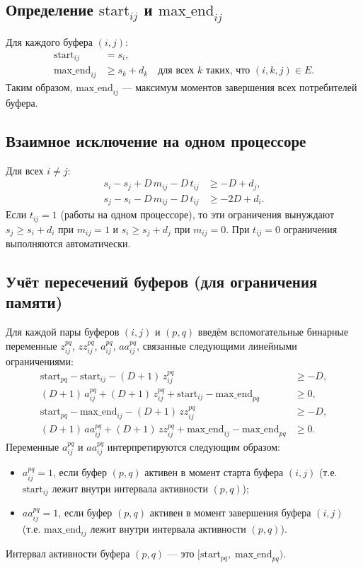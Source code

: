 \subsection*{Определение $\text{start}_{ij}$ и $\text{max\_end}_{ij}$}

Для каждого буфера $(i,j)$:
\begin{align}
	\text{start}_{ij} &= s_i, \label{eq:start_def}\\
	\text{max\_end}_{ij} &\ge s_k + d_k \quad \text{для всех } k \text{ таких, что } (i,k,j)\in E. \label{eq:max_end_def}
\end{align}
Таким образом, $\text{max\_end}_{ij}$ — максимум моментов завершения всех потребителей буфера.

\subsection*{Взаимное исключение на одном процессоре}

Для всех $i\neq j$:
\begin{align}
	s_i - s_j + D\,m_{ij} - D\,t_{ij} &\ge -D + d_j, \label{eq:no_conflict1}\\
	s_j - s_i - D\,m_{ij} - D\,t_{ij} &\ge -2D + d_i. \label{eq:no_conflict2}
\end{align}
Если $t_{ij}=1$ (работы на одном процессоре), то эти ограничения вынуждают $s_j \ge s_i + d_i$ при $m_{ij}=1$ и $s_i \ge s_j + d_j$ при $m_{ij}=0$. При $t_{ij}=0$ ограничения выполняются автоматически.

\subsection*{Учёт пересечений буферов (для ограничения памяти)}

Для каждой пары буферов $(i,j)$ и $(p,q)$ введём вспомогательные бинарные переменные $z_{ij}^{pq}$, $zz_{ij}^{pq}$, $a_{ij}^{pq}$, $aa_{ij}^{pq}$, связанные следующими линейными ограничениями:
\begin{align}
	\text{start}_{pq} - \text{start}_{ij} - (D+1)\,z_{ij}^{pq} &\ge -D, \label{eq:z_start}\\
	(D+1)\,a_{ij}^{pq} + (D+1)\,z_{ij}^{pq} + \text{start}_{ij} - \text{max\_end}_{pq} &\ge 0, \label{eq:a_start}\\
	\text{start}_{pq} - \text{max\_end}_{ij} - (D+1)\,zz_{ij}^{pq} &\ge -D, \label{eq:zz_end}\\
	(D+1)\,aa_{ij}^{pq} + (D+1)\,zz_{ij}^{pq} + \text{max\_end}_{ij} - \text{max\_end}_{pq} &\ge 0. \label{eq:aa_end}
\end{align}
Переменные $a_{ij}^{pq}$ и $aa_{ij}^{pq}$ интерпретируются следующим образом:
\begin{itemize}
	\item $a_{ij}^{pq}=1$, если буфер $(p,q)$ активен в момент старта буфера $(i,j)$ (т.е. $\text{start}_{ij}$ лежит внутри интервала активности $(p,q)$);
	\item $aa_{ij}^{pq}=1$, если буфер $(p,q)$ активен в момент завершения буфера $(i,j)$ (т.е. $\text{max\_end}_{ij}$ лежит внутри интервала активности $(p,q)$).
\end{itemize}
Интервал активности буфера $(p,q)$ — это $[\text{start}_{pq},\; \text{max\_end}_{pq})$.

